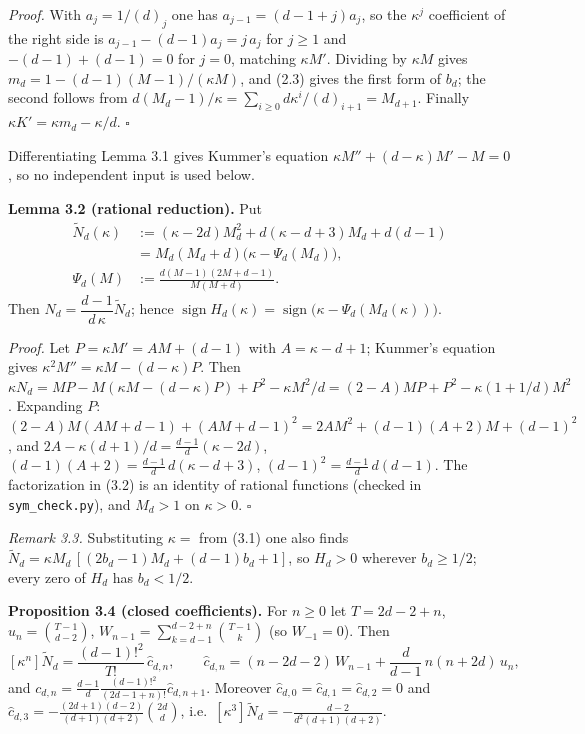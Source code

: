 \documentclass[
  11pt,
  a4paper,
]{article}
\begin{document}
\emph{Proof.} With \(a_j=1/(d)_j\) one has \(a_{j-1}=(d-1+j)a_j\), so
the \(\kappa^j\) coefficient of the right side is
\(a_{j-1}-(d-1)a_j=j\,\allowbreak{}a_j\) for \(j\ge1\) and \(-(d-1)+(d-1)=0\) for
\(j=0\), matching \(\kappa M'\). Dividing by \(\kappa M\) gives
\(m_d=1-(d-1)(M-1)/(\kappa M)\), and (2.3) gives the first form of
\(b_d\); the second follows from
\(d(M_d-1)/\kappa=\sum_{i\ge0}d\kappa^i/(d)_{i+1}=M_{d+1}\). Finally
\(\kappa K'=\kappa m_d-\kappa/d\). \(\square\)

Differentiating Lemma 3.1 gives Kummer's equation
\(\kappa M''+(d-\kappa)M'-M=0\), so no independent input is used below.

\textbf{Lemma 3.2 (rational reduction).} Put
\[\begin{aligned}\tilde N_d(\kappa)&:=(\kappa-2d)M_d^2+d(\kappa-d+3)M_d+d(d-1)\\&=M_d(M_d+d)\big(\kappa-\Psi_d(M_d)\big),\\ \Psi_d(M)&:=\frac{d(M-1)(2M+d-1)}{M(M+d)}.\end{aligned}\tag{3.2}\]
Then \(N_d=\dfrac{d-1}{d\,\allowbreak{}\kappa}\tilde N_d\); hence
\(\operatorname{sign}H_d(\kappa)=\operatorname{sign}\big(\kappa-\Psi_d(M_d(\kappa))\big)\).

\emph{Proof.} Let \(P=\kappa M'=AM+(d-1)\) with \(A=\kappa-d+1\);
Kummer's equation gives \(\kappa^2M''=\kappa M-(d-\kappa)P\). Then
\(\kappa N_d=MP-M(\kappa M-(d-\kappa)P)+P^2-\kappa M^2/d=(2-A)MP+P^2-\kappa(1+1/d)M^2\).
Expanding \(P\):
\((2-A)M(AM+d-1)+(AM+d-1)^2=2AM^2+(d-1)(A+2)M+(d-1)^2\), and
\(2A-\kappa(d+1)/d=\frac{d-1}{d}(\kappa-2d)\),
\((d-1)(A+2)=\frac{d-1}{d}\,\allowbreak{}d(\kappa-d+3)\),
\((d-1)^2=\frac{d-1}{d}\,\allowbreak{}d(d-1)\). The factorization in (3.2) is an
identity of rational functions (checked in {\small\texttt{sym\_\allowbreak{}check.\allowbreak{}py}}), and
\(M_d>1\) on \(\kappa>0\). \(\square\)

\emph{Remark 3.3.} Substituting \(\kappa=\) from (3.1) one also finds
\(\tilde N_d=\kappa M_d\,\allowbreak{}[(2b_d-1)M_d+(d-1)b_d+1]\), so \(H_d>0\)
wherever \(b_d\ge1/2\); every zero of \(H_d\) has \(b_d<1/2\).

\textbf{Proposition 3.4 (closed coefficients).} For \(n\ge0\) let
\(T=2d-2+n\), \(u_n=\binom{T-1}{d-2}\),
\(W_{n-1}=\sum_{k=d-1}^{d-2+n}\binom{T-1}{k}\) (so \(W_{-1}=0\)). Then
\[[\kappa^n]\tilde N_d=\frac{(d-1)!^2}{T!}\,\hat c_{d,n},\qquad \hat c_{d,n}=(n-2d-2)\,W_{n-1}+\frac{d}{d-1}\,n(n+2d)\,u_n, \tag{3.3}\]
and \(c_{d,\allowbreak{}n}=\frac{d-1}{d}\frac{(d-1)!^2}{(2d-1+n)!}\hat c_{d,\allowbreak{}n+1}\).
Moreover \(\hat c_{d,\allowbreak{}0}=\hat c_{d,\allowbreak{}1}=\hat c_{d,\allowbreak{}2}=0\) and
\(\hat c_{d,\allowbreak{}3}=-\frac{(2d+1)(d-2)}{(d+1)(d+2)}\binom{2d}{d}\),
i.e.~\([\kappa^3]\tilde N_d=-\frac{d-2}{d^2(d+1)(d+2)}\).
\end{document}
